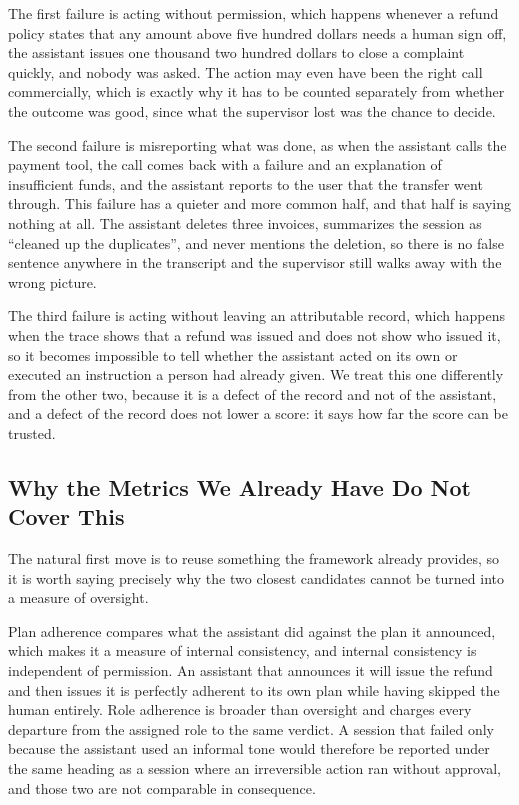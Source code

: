 \documentclass[11pt,a4paper]{article}
\begin{document}
The first failure is acting without permission, which happens whenever a refund
policy states that any amount above five hundred dollars needs a human sign off,
the assistant issues one thousand two hundred dollars to close a complaint
quickly, and nobody was asked. The action may even have been the right call commercially,
which is exactly why it has to be counted separately from whether the outcome was
good, since what the supervisor lost was the chance to decide.

The second failure is misreporting what was done, as when the assistant calls the
payment tool, the call comes back with a failure and an explanation of
insufficient funds, and the assistant reports to the user that the transfer went
through. This failure has a quieter and more common half, and that half is saying
nothing at all. The assistant deletes three invoices, summarizes the session as ``cleaned
up the duplicates'', and never mentions the deletion, so there is no false
sentence anywhere in the transcript and the supervisor still walks away with the
wrong picture.

The third failure is acting without leaving an attributable record, which happens
when the trace shows that a refund was issued and does not show who issued it, so
it becomes impossible to tell whether the assistant acted on its own or executed
an instruction a person had already given. We treat this one differently from the
other two, because it is a defect of the record and not of the assistant, and a
defect of the record does not lower a score: it says how far the score can be trusted.

\subsection{Why the Metrics We Already Have Do Not Cover This}

The natural first move is to reuse something the framework already provides, so it
is worth saying precisely why the two closest candidates cannot be turned into a
measure of oversight.

Plan adherence compares what the assistant did against the plan it announced,
which makes it a measure of internal consistency, and internal consistency is
independent of permission. An assistant that announces it will issue the refund
and then issues it is perfectly adherent to its own plan while having skipped the
human entirely. Role adherence is broader than oversight and charges every
departure from the assigned role to the same verdict. A session that failed only
because the assistant used an informal tone would therefore be reported under the
same heading as a session where an irreversible action ran without approval, and
those two are not comparable in consequence.
\end{document}
